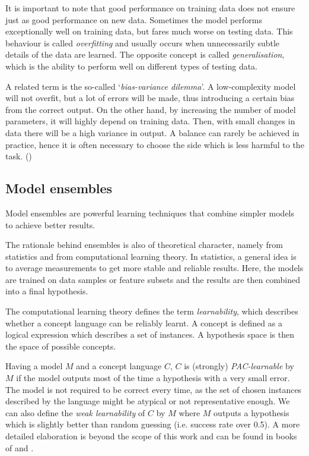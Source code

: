 It is important to note that good performance on training data does not ensure 
just as good performance on new data. Sometimes the model performs 
exceptionally well on training data, but fares much worse on testing data. 
This behaviour is called \emph{overfitting} and usually occurs when 
unnecessarily subtle details of the data are learned. The opposite concept 
is called \emph{generalisation}, which is the ability to perform well on 
different types of testing data.

A related term is the so-called `\emph{bias-variance dilemma}'. A 
low-complexity model will not overfit, but a lot of errors will be made, thus 
introducing a certain bias from the correct output. On the other hand, by 
increasing the number of model parameters, it will highly depend on training 
data. Then, with small changes in data there will be a high variance in 
output. A balance can rarely be achieved in practice, hence it is often 
necessary to choose the side which is less harmful to the task.
(\citet[p.~93--94]{Flach:2012:MLA:2490546})

\subsection{Model ensembles}
Model ensembles are powerful learning techniques that combine simpler models 
to achieve better results. %

The rationale behind ensembles is also of theoretical character, namely from
statistics and from computational learning theory. In statistics, a general
idea is to average measurements to get more stable and reliable results.
Here, the models are trained on data samples or feature subsets and the results
are then combined into a final hypothesis.

The computational learning theory defines the term \emph{learnability},
which describes whether a concept language can be reliably learnt. A concept is
defined as a logical expression which describes a set of instances. A 
hypothesis space is then the space of possible concepts.

Having a model $M$ and a concept language $C$, $C$ is (strongly)
\emph{PAC-learnable} by $M$ if the model outputs most of the time a hypothesis 
with a very small error. The model is not required to be correct every time, 
as the set of chosen instances described by the language might be atypical 
or not representative enough.  We can also define the \emph{weak learnability} 
of $C$ by $M$ where $M$ outputs a hypothesis which is slightly better than 
random guessing (i.e. success rate over 0.5). A more detailed elaboration
is beyond the scope of this work and can be found in books of 
\citep{Flach:2012:MLA:2490546} and \citep{Mitchell:1997:ML:541177}.

